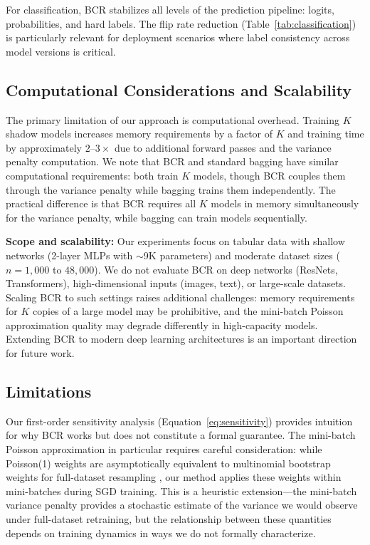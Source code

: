 \documentclass[12pt, letterpaper]{article}
\begin{document}
For classification, BCR stabilizes all levels of the prediction pipeline: logits, probabilities, and hard labels. The flip rate reduction (Table~\ref{tab:classification}) is particularly relevant for deployment scenarios where label consistency across model versions is critical.

\subsection{Computational Considerations and Scalability}

The primary limitation of our approach is computational overhead. Training $K$ shadow models increases memory requirements by a factor of $K$ and training time by approximately $2$--$3\times$ due to additional forward passes and the variance penalty computation. We note that BCR and standard bagging have similar computational requirements: both train $K$ models, though BCR couples them through the variance penalty while bagging trains them independently. The practical difference is that BCR requires all $K$ models in memory simultaneously for the variance penalty, while bagging can train models sequentially.

\textbf{Scope and scalability:} Our experiments focus on tabular data with shallow networks (2-layer MLPs with $\sim$9K parameters) and moderate dataset sizes ($n = 1{,}000$ to $48{,}000$). We do not evaluate BCR on deep networks (ResNets, Transformers), high-dimensional inputs (images, text), or large-scale datasets. Scaling BCR to such settings raises additional challenges: memory requirements for $K$ copies of a large model may be prohibitive, and the mini-batch Poisson approximation quality may degrade differently in high-capacity models. Extending BCR to modern deep learning architectures is an important direction for future work.

\subsection{Limitations}
\label{sec:theory_gaps}

Our first-order sensitivity analysis (Equation~\ref{eq:sensitivity}) provides intuition for why BCR works but does not constitute a formal guarantee. The mini-batch Poisson approximation in particular requires careful consideration: while Poisson(1) weights are asymptotically equivalent to multinomial bootstrap weights for full-dataset resampling \citep{hanley2006poisson}, our method applies these weights within mini-batches during SGD training. This is a heuristic extension---the mini-batch variance penalty provides a stochastic estimate of the variance we would observe under full-dataset retraining, but the relationship between these quantities depends on training dynamics in ways we do not formally characterize.
\end{document}
